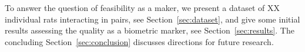 \documentclass[conference,10pt,times,letter]{IEEEtran}
\begin{document}
To answer the question of feasibility as a maker, we present a dataset of XX individual rats interacting in pairs, see Section~\ref{sec:dataset}, and give some initial results assessing the quality as a biometric marker, see Section~\ref{sec:results}. The concluding Section~\ref{sec:conclusion} discusses directions for future research. 









\end{document}
